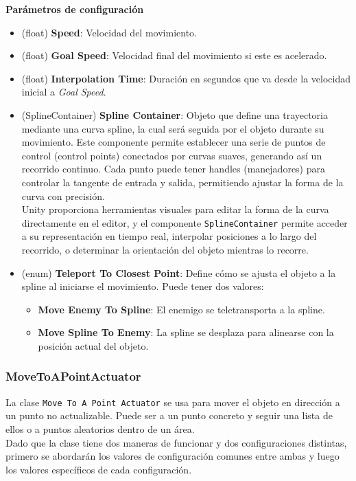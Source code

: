 \textbf{Parámetros de configuración}
\begin{itemize}
	\item (float) \textbf{Speed}: Velocidad del movimiento.
	\item (float) \textbf{Goal Speed}: Velocidad final del movimiento si este es acelerado.
	\item (float) \textbf{Interpolation Time}: Duración en segundos que va desde la velocidad inicial a \textit{Goal Speed}.
	\item (SplineContainer) \textbf{Spline Container}: Objeto que define una trayectoria mediante una curva spline, la cual será seguida por el objeto durante su movimiento. Este componente permite establecer una serie de puntos de control (control points) conectados por curvas suaves, generando así un recorrido continuo. Cada punto puede tener handles (manejadores) para controlar la tangente de entrada y salida, permitiendo ajustar la forma de la curva con precisión.\\
Unity proporciona herramientas visuales para editar la forma de la curva directamente en el editor, y el componente \texttt{SplineContainer} permite acceder a su representación en tiempo real, interpolar posiciones a lo largo del recorrido, o determinar la orientación del objeto mientras lo recorre.
	\item (enum) \textbf{Teleport To Closest Point}: Define cómo se ajusta el objeto a la spline al iniciarse el movimiento. Puede tener dos valores:
	\begin{itemize}
		\item \textbf{Move Enemy To Spline}: El enemigo se teletransporta a la spline.
		\item \textbf{Move Spline To Enemy}: La spline se desplaza para alinearse con la posición actual del objeto.
	\end{itemize}
\end{itemize}

\subsubsection{MoveToAPointActuator}
La clase \texttt{Move To A Point Actuator} se usa para mover el objeto en dirección a un punto no actualizable. Puede ser a un punto concreto y seguir una lista de ellos o a puntos aleatorios dentro de un área.\\
Dado que la clase tiene dos maneras de funcionar y dos configuraciones distintas, primero se abordarán los valores de configuración comunes entre ambas y luego los valores específicos de cada configuración.\\

